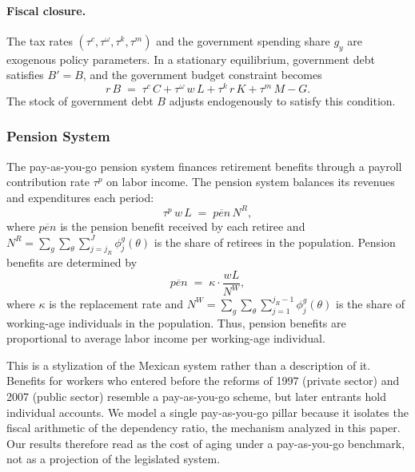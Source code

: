 \documentclass[12pt,a4paper]{article}
\begin{document}
\paragraph{Fiscal closure.}
The tax rates $(\tau^c, \tau^\omega, \tau^k, \tau^m)$ and the government spending share $g_y$ are exogenous policy parameters. In a stationary equilibrium, government debt satisfies $B'=B$, and the government budget constraint becomes
\begin{equation}
\label{eq:gov_stationary}
r\, B \;=\; \tau^c\, C + \tau^\omega\, w\, L + \tau^k\, r\, K + \tau^m\, M - G.
\end{equation}
The stock of government debt $B$ adjusts endogenously to satisfy this condition.


\subsubsection{Pension System}
\label{subsubsec:pension}

The pay-as-you-go pension system finances retirement benefits through a payroll contribution rate $\tau^p$ on labor income. The pension system balances its revenues and expenditures each period:
\begin{equation}
\label{eq:pension_balance}
\tau^p\, w\, L \;=\; \overline{pen}\, N^R,
\end{equation}
where $\overline{pen}$ is the pension benefit received by each retiree and $N^R = \sum_g \sum_\theta \sum_{j=j_R}^{J} \phi_j^{g}(\theta)$ is the share of retirees in the population. Pension benefits are determined by
\begin{equation}
\label{eq:pension_benefit}
\overline{pen} \;=\; \kappa \cdot \frac{w L}{N^W},
\end{equation}
where $\kappa$ is the replacement rate and $N^W = \sum_g \sum_\theta \sum_{j=1}^{j_R - 1} \phi_j^{g}(\theta)$ is the share of working-age individuals in the population. Thus, pension benefits are proportional to average labor income per working-age individual.

This is a stylization of the Mexican system rather than a description of it. Benefits for workers who entered before the reforms of 1997 (private sector) and 2007 (public sector) resemble a pay-as-you-go scheme, but later entrants hold individual accounts. We model a single pay-as-you-go pillar because it isolates the fiscal arithmetic of the dependency ratio, the mechanism analyzed in this paper. Our results therefore read as the cost of aging under a pay-as-you-go benchmark, not as a projection of the legislated system.
\end{document}
